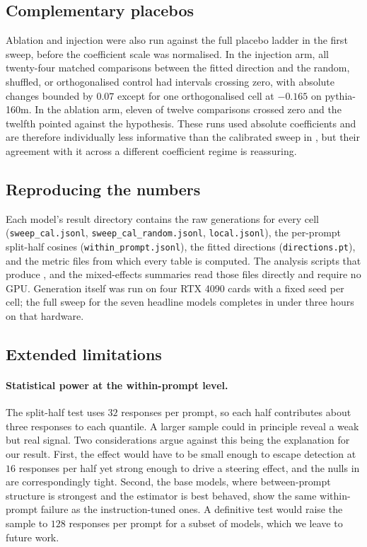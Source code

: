 \subsection{Complementary placebos}

Ablation and injection were also run against the full placebo ladder in the first sweep, before the
coefficient scale was normalised. In the injection arm, all twenty-four matched comparisons between
the fitted direction and the random, shuffled, or orthogonalised control had intervals crossing zero,
with absolute changes bounded by $0.07$ \vendi{} except for one orthogonalised cell at $-0.165$ on
pythia-160m. In the ablation arm, eleven of twelve comparisons crossed zero and the twelfth pointed
against the hypothesis. These runs used absolute coefficients and are therefore individually less
informative than the calibrated sweep in , but their agreement with it across
a different coefficient regime is reassuring.

\subsection{Reproducing the numbers}

Each model's result directory contains the raw generations for every cell (\texttt{sweep\_cal.jsonl},
\texttt{sweep\_cal\_random.jsonl}, \texttt{local.jsonl}), the per-prompt split-half cosines
(\texttt{within\_prompt.jsonl}), the fitted directions (\texttt{directions.pt}), and the metric files
from which every table is computed. The analysis scripts that produce ,
 and the mixed-effects summaries read those files directly and require no GPU.
Generation itself was run on four RTX 4090 cards with a fixed seed per cell; the full sweep for the
seven headline models completes in under three hours on that hardware.

\subsection{Extended limitations}
\label{app:limitations}

\paragraph{Statistical power at the within-prompt level.}
The split-half test uses $32$ responses per prompt, so each half contributes about three responses
to each quantile. A larger sample could in principle reveal a weak but real signal. Two
considerations argue against this being the explanation for our result. First, the effect would have
to be small enough to escape detection at $16$ responses per half yet strong enough to drive a
steering effect, and the nulls in  are correspondingly tight. Second, the
base models, where between-prompt structure is strongest and the estimator is best behaved, show the
same within-prompt failure as the instruction-tuned ones. A definitive test would raise the sample
to $128$ responses per prompt for a subset of models, which we leave to future work.

